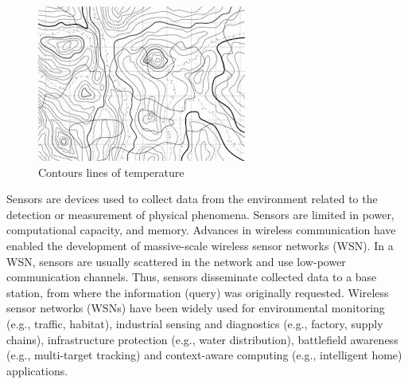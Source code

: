 \documentclass[conference]{IEEEtran}
\begin{document}
\begin{figure}[!htb]
\centering
	\includegraphics[scale=0.7]{I2.png}
    \caption{Contours lines of temperature}
    \label{lab}
\end{figure}

Sensors are devices used to collect data from the environment related to the
detection or measurement of physical phenomena. Sensors are limited in power,
computational capacity, and memory. Advances in wireless communication have
enabled the development of massive-scale wireless sensor networks (WSN). In a
WSN, sensors are usually scattered in the network and use low-power
communication channels. Thus, sensors disseminate collected data to a base
station, from where the information (query) was originally requested. Wireless
sensor networks (WSNs) have been widely used for environmental monitoring (e.g.,
traffic, habitat), industrial sensing and diagnostics (e.g., factory, supply
chains), infrastructure protection (e.g., water distribution), battlefield
awareness (e.g., multi-target tracking) and context-aware computing (e.g.,
intelligent home) applications.

% 
\end{document}
